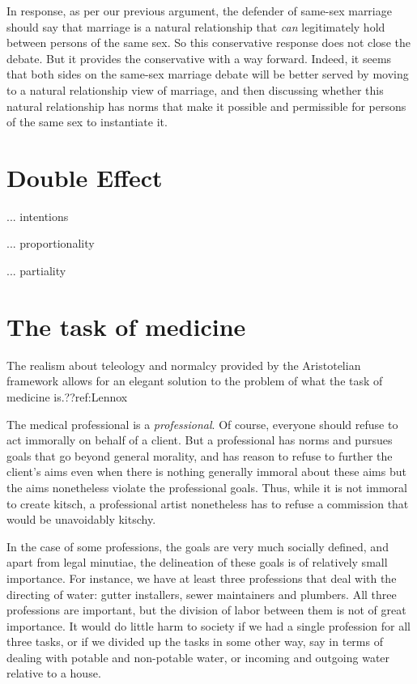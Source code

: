 In response, as per our previous argument, the defender of same-sex marriage should say that marriage is a natural relationship that \textit{can} legitimately
hold between persons of the same sex. So this conservative response does not close the debate. But it provides the conservative with a way forward. Indeed,
it seems that both sides on the same-sex marriage debate will be better served by moving to a natural relationship view of marriage, and then discussing whether
this natural relationship has norms that make it possible and permissible for persons of the same sex to instantiate it.

\section{Double Effect}
... intentions

... proportionality

... partiality

\section{The task of medicine}
The realism about teleology and normalcy provided by the Aristotelian framework
allows for an elegant solution to the problem of what the task of medicine is.??ref:Lennox

The medical professional is a \textit{professional}. Of course, everyone should refuse to act immorally on behalf of a client. But a professional has norms
and pursues goals that go beyond general morality, and has reason to refuse to further the client's aims even when there is nothing generally immoral about
these aims but the aims nonetheless violate the professional goals. Thus, while it is not immoral to create kitsch, a professional artist nonetheless has
to refuse a commission that would be unavoidably kitschy.

In the case of some professions, the goals are very much socially defined, and apart from legal minutiae, the delineation of these goals is of relatively
small importance. For instance, we have at least three professions that deal with the directing of water: gutter installers, sewer maintainers and plumbers.
All three professions are important, but the division of labor between them is not of great importance. It would do little harm to society if we had a single
profession for all three tasks, or if we divided up the tasks in some other way, say in terms of dealing with potable and non-potable water, or incoming
and outgoing water relative to a house.

